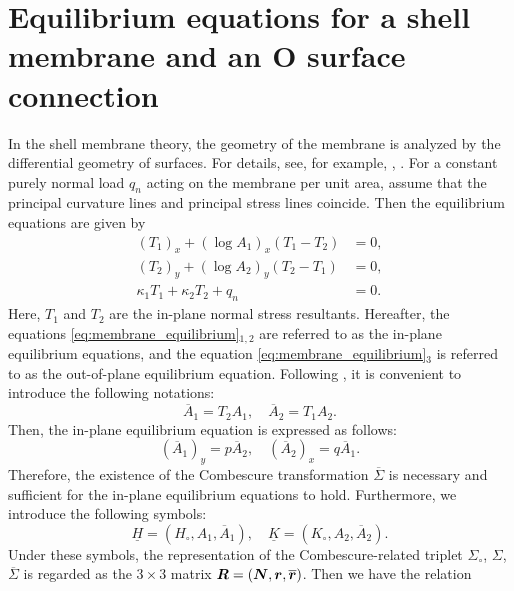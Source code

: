 \documentclass[a4paper]{amsart}
\def\br{\mbox{\boldmath $r$}}
\def\bH{\underline{H}}
\def\bK{\underline{K}}
\def\bN{\mbox{\boldmath $N$}}
\def\bR{\mbox{\boldmath $R$}}
\theoremstyle{definition}
\begin{document}
\section{Equilibrium equations for a shell membrane and an O surface connection}
\label{sec:equilibrium}

In the shell membrane theory, the geometry of the membrane is analyzed by the differential geometry of surfaces.
For details, see, for example, \cite{Love}, \cite{Novozhilov}.
For a constant purely normal load $q_n$ acting on the membrane per unit area, assume that the principal curvature lines and principal stress lines coincide.
Then the equilibrium equations are given by
\begin{equation}
\label{eq:membrane_equilibrium}
\begin{aligned}
(T_1)_x + (\log A_1)_x (T_1 - T_2) &= 0,\\
(T_2)_y + (\log A_2)_y (T_2 - T_1) &= 0,\\
\kappa_1 T_1 + \kappa_2 T_2 + q_n &= 0.
\end{aligned}
\end{equation}
Here, $T_1$ and $T_2$ are the in-plane normal stress resultants.
Hereafter, the equations \eqref{eq:membrane_equilibrium}${}_{1,2}$ are referred to as the in-plane equilibrium equations, and the equation \eqref{eq:membrane_equilibrium}${}_3$ is referred to as the out-of-plane equilibrium equation.
Following \cite{RogersSchief}, it is convenient to introduce the following notations:
\begin{equation}
\overline{A}_1 = T_2 A_1, \quad
\overline{A}_2 = T_1 A_2.
\end{equation}
Then, the in-plane equilibrium equation is expressed as follows:
\begin{equation}
(\overline{A}_1)_y = p \overline{A}_2, \quad
(\overline{A}_2)_x = q \overline{A}_1.
\end{equation}
Therefore, the existence of the Combescure transformation $\overline{\Sigma}$ is necessary and sufficient for the in-plane equilibrium equations to hold.
Furthermore, we introduce the following symbols:
\begin{equation}
\bH = (H_\circ, A_1, \overline{A}_1), \quad
\bK = (K_\circ, A_2, \overline{A}_2).
\end{equation}
Under these symbols, the representation of the Combescure-related triplet $\Sigma_\circ$, $\Sigma$, $\overline{\Sigma}$ is regarded as the $3\times 3$ matrix $\bR = (\bN, \br, \overline{\br})$.
Then we have the relation
\end{document}
